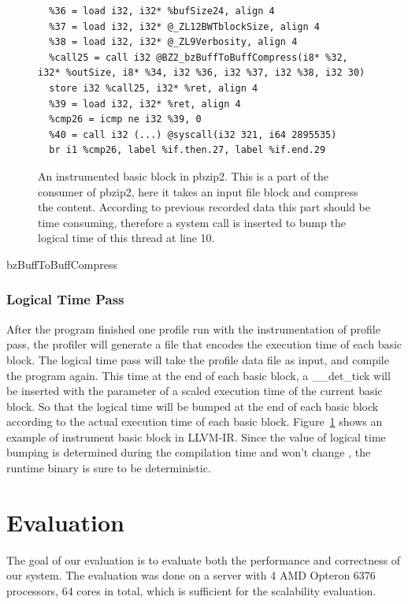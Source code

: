 \documentclass{sig-alternate}
\begin{document}
\begin{figure}
\centering
\begin{lstlisting}[frame=single,breaklines=true]
  %bufSize24 = getelementptr inbounds %struct.outBuff, %struct.outBuff* %35, i32 0, i32 1
  %36 = load i32, i32* %bufSize24, align 4
  %37 = load i32, i32* @_ZL12BWTblockSize, align 4
  %38 = load i32, i32* @_ZL9Verbosity, align 4
  %call25 = call i32 @BZ2_bzBuffToBuffCompress(i8* %32, i32* %outSize, i8* %34, i32 %36, i32 %37, i32 %38, i32 30)
  store i32 %call25, i32* %ret, align 4
  %39 = load i32, i32* %ret, align 4
  %cmp26 = icmp ne i32 %39, 0
  %40 = call i32 (...) @syscall(i32 321, i64 2895535)
  br i1 %cmp26, label %if.then.27, label %if.end.29

\end{lstlisting}
\caption{An instrumented basic block in pbzip2. This is a part of the consumer of pbzip2, here it takes an input file block and compress the content. According to previous recorded data this part should be time consuming, therefore a system call is inserted to bump the logical time of this thread at line 10.}
\label{fig:p3-1}
\end{figure}
bzBuffToBuffCompress
\subsubsection{Logical Time Pass}
After the program finished one profile run with the instrumentation of profile pass, the profiler will generate a file that encodes the execution time of each basic block. The logical time pass will take the profile data file as input, and compile the program again. This time at the end of each basic block, a \_\_det\_tick will be inserted with the parameter of a scaled execution time of the current basic block. So that the logical time will be bumped at the end of each basic block according to the actual execution time of each basic block. Figure~\ref{fig:p3-1} shows an example of instrument basic block in LLVM-IR. Since the value of logical time bumping is determined during the compilation time and won't change , the runtime binary is sure to be deterministic.

\section{Evaluation}
The goal of our evaluation is to evaluate both the performance and correctness of our system. The evaluation was done on a server with 4 AMD Opteron 6376 processors, 64 cores in total, which is sufficient for the scalability evaluation.
\end{document}
